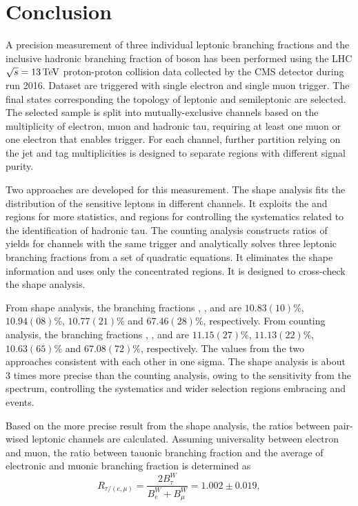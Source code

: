 \chapter{Conclusion}
\label{sec:conclusion}


A precision measurement of three individual leptonic branching fractions and the inclusive hadronic branching fraction of \PW boson has been performed using the LHC $\sqrt{s}=13\,\text{Te\hspace{-.08em}V}$ proton-proton collision data collected by the CMS detector during run 2016. Dataset are triggered with single electron and single muon trigger. The final states corresponding the topology of leptonic and semileptonic \ttbar are selected. The selected sample is split into mutually-exclusive channels based on the multiplicity of electron, muon and hadronic tau, requiring at least one muon or one electron that enables trigger. For each channel, further partition relying on the jet and \PQb tag multiplicities is designed to separate regions with different signal purity.

Two approaches are developed for this measurement. The shape analysis fits the \pt distribution of the sensitive leptons in different channels. It exploits the \WW and \wjets regions for more \PW statistics, and \zjets regions for controlling the systematics related to the identification of hadronic tau. The counting analysis constructs ratios of yields for channels with the same trigger and analytically solves three leptonic branching fractions from a set of quadratic equations. It eliminates the shape information and uses only the \ttbar concentrated regions. It is designed to cross-check the shape analysis. 


From shape analysis, the \PW branching fractions \BWe, \BWm, \BWt and \BWh are $10.83(10)\%$, $10.94(08)\%$, $10.77(21)\%$ and $67.46(28)\%$, respectively. From counting analysis, the \PW branching fractions \BWe, \BWm, \BWt and \BWh are $11.15(27)\%$, $11.13(22)\%$, $10.63(65)\%$ and $67.08(72)\%$, respectively. The values from the two approaches consistent with each other in one sigma. The shape analysis is about 3 times more precise than the counting analysis, owing to the sensitivity from the \pt spectrum, controlling the \PGth systematics and wider selection regions embracing \WW and \wjets events. 

Based on the more precise result from the shape analysis, the ratios between pair-wised leptonic channels are calculated. Assuming universality between electron and muon, the ratio between tauonic branching fraction and the average of electronic and muonic branching fraction is determined as
\begin{equation*}
    R_{\tau/(e,\mu)} = \frac{2 B^W_\tau} {B^W_e +  B^W_\mu} = 1.002\pm0.019,
\end{equation*}

